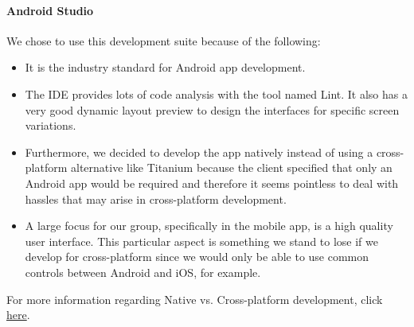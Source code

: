 \documentclass[11pt,a4paper,titlepage]{article}
\begin{document}
			\paragraph{Android Studio}
				 We chose to use this development suite because of the following:
				\begin{itemize}
				\item It is the industry standard for Android app development.
				\item The IDE provides lots of code analysis with the tool named Lint. It also has a very good dynamic layout preview to design the interfaces for specific screen variations.
				\item Furthermore, we decided to develop the app natively instead of using a cross-platform alternative like Titanium because the client specified that only an Android app would be required and therefore it seems pointless to deal with hassles that may arise in cross-platform development. 
				\item A large focus for our group, specifically in the mobile app, is a high quality user interface. This particular aspect is something we stand to lose if we develop for cross-platform since we would only be able to use common controls between Android and iOS, for example.\end{itemize} 
				For more information regarding Native vs. Cross-platform development, click \href{https://yalantis.com/blog/native-vs-cross-platform-app-development-shouldnt-work-cross-platform/}{here}.
\end{document}
